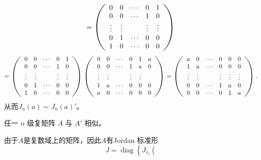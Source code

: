 \begin{enumerate}[1~]
\begin{enumerate}[1.~]
\begin{solution}
\begin{subproof}
\[= \left( \begin{array} { c c c c c } { 0 } & { 0 } & { \cdots } & { 0 } & { 1 } \\ { 0 } & { 0 } & { \cdots } & { 1 } & { 0 } \\ { \vdots } & { \vdots } & { } & { \vdots } & { \vdots } \\ { 0 } & { 1 } & { \cdots } & { 0 } & { 0 } \\ { 1 } & { 0 } & { \cdots } & { 0 } & { 0 } \end{array} \right) 
\]
\[
= \left( \begin{array} { c c c c c } { 0 } & { 0 } & { \cdots } & { 0 } & { 1 } \\ { 0 } & { 0 } & { \cdots } & { 1 } & { 0 } \\ { \vdots } & { \vdots } & { } & { \vdots } & { \vdots } \\ { 0 } & { 1 } & { \cdots } & { 0 } & { 0 } \\ { 1 } & { 0 } & { \cdots } & { 0 } & { 0 } \end{array} \right) \left( \begin{array} { c c c c c c } { 0 } & { 0 } & { \cdots } & { 0 } & { 1 } & { a } \\ { 0 } & { 0 } & { \cdots } & { 1 } & { a } & { 0 } \\ { \vdots } & { \vdots } & { } & { \vdots } & { \vdots } \\ { 1 } & { a } & { \cdots } & { 0 } & { 0 } & { 0 } \\ { a } & { 0 } & { \cdots } & { 0 } & { 0 } & { 0 } \end{array} \right) = \left( \begin{array} { c c c c c c } { a } & { 0 } & { \cdots } & { 0 } & { 0 } & { 0 } \\ { 1 } & { a } & { \cdots } & { 0 } & { 0 } & { 0 } \\ { \vdots } & { \vdots } & { } & { \vdots } & { \vdots } & { \vdots } \\ { 0 } & { 0 } & { \cdots } & { 1 } & { a } & { 0 } \\ { 0 } & { 0 } & { \cdots } & { 0 } & { 1 } & { a } \end{array} \right).
\]
从而$J_n(a)\sim J_n(a)'$。
\end{subproof}
\begin{lemma}
任一 $n$ 级复矩阵 $A$ 与 $A'$ 相似。
\end{lemma}
\begin{subproof}
由于$A$是复数域上的矩阵，因此$A$有Jordan 标准形\[
J = 
\operatorname { diag } \left\{ J _ { r _ { 1 } } \left( 
\]
\end{subproof}
\end{solution}
\end{enumerate}
\end{enumerate}
